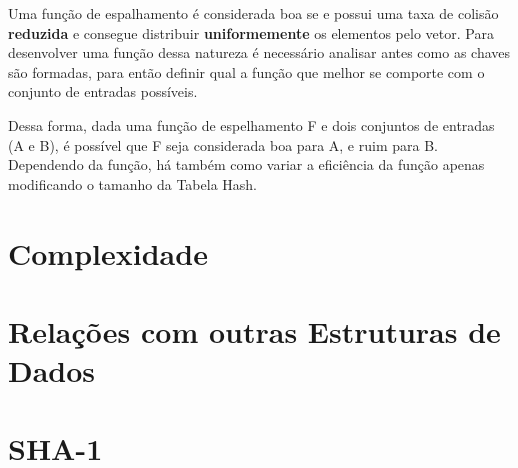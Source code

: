 \documentclass[12pt,openright,oneside,a4paper,english,brazil]{abntex2}
\begin{document}
    Uma função de espalhamento é considerada boa se e possui uma taxa de colisão \textbf{reduzida} e consegue distribuir \textbf{uniformemente} os elementos pelo vetor.
    Para desenvolver uma função dessa natureza é necessário analisar antes como as chaves são formadas, para então definir qual a função que melhor se comporte com o conjunto de entradas possíveis.

    Dessa forma, dada uma função de espelhamento F e dois conjuntos de entradas (A e B), é possível que F seja considerada boa para A, e ruim para B.
    Dependendo da função, há também como variar a eficiência da função apenas modificando o tamanho da Tabela Hash.

\section*{Complexidade}

\section*{Relações com outras Estruturas de Dados}

\section*{SHA-1}
\end{document}
